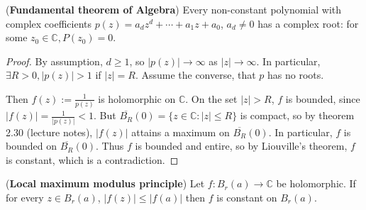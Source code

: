 \begin{theorem}
	(\textbf{Fundamental theorem of Algebra}) Every non-constant polynomial with complex coefficients $p(z) = a_d z^d + \cdots + a_1 z + a_0$, $a_d \ne 0$ has a complex root: for some $z_0 \in \mathbb{C}, P(z_0) = 0$.
\end{theorem}

\begin{proof}
	By assumption, $d \ge 1$, so $|p(z)| \rightarrow \infty$ as $|z| \rightarrow \infty$. In particular, $\exists R > 0, |p(z)| > 1$ if $|z| = R$. Assume the converse, that $p$ has no roots.

	Then $f(z) := \frac{1}{p(z)}$ is holomorphic on $\mathbb{C}$. On the set $|z| > R$, $f$ is bounded, since $|f(z)| = \frac{1}{|p(z)|} < 1$. But $\overline{B_R}(0) = \{ z \in \mathbb{C}: |z| \le R \}$ is compact, so by theorem 2.30 (lecture notes), $|f(z)|$ attains a maximum on $\overline{B_R}(0)$. In particular, $f$ is bounded on $\overline{B_R}(0)$. Thus $f$ is bounded and entire, so by Liouville's theorem, $f$ is constant, which is a contradiction.
\end{proof}

\begin{theorem}
	(\textbf{Local maximum modulus principle}) Let $f: B_r(a) \rightarrow \mathbb{C}$ be holomorphic. If for every $z \in B_r(a)$, $|f(z)| \le |f(a)|$ then $f$ is constant on $B_r(a)$.
\end{theorem}


